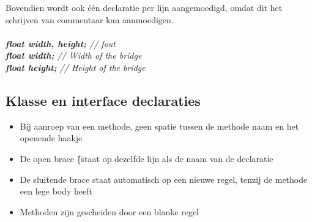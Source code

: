 		Bovendien wordt ook één declaratie per lijn aangemoedigd, omdat dit het schrijven van commentaar kan aanmoedigen.
		\\ \\
		\emph{\textbf{float width, height;} // fout} \\
		\emph{\textbf{float width;} // Width of the bridge} \\
		\emph{\textbf{float height;} // Height of the bridge}
		

\subsection{Klasse en interface declaraties}
	\begin{itemize}
		\item{Bij aanroep van een methode, geen spatie tussen de methode naam en het openende haakje}
		\item{De open brace \"\{\" staat op dezelfde lijn als de naam van de declaratie}
		\item{De sluitende brace staat automatisch op een nieuwe regel, tenzij de methode een lege body heeft}
		\item{Methoden zijn gescheiden door een blanke regel}
	\end{itemize}